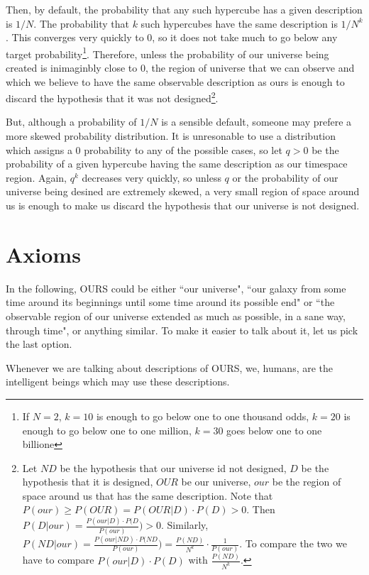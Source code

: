 \documentclass[a4paper
,draft
]{article}
\newcommand{\ghilimele}[1]{``#1"}
\begin{document}
Then, by default, the probability that any such hypercube has a given description is $1/N$. The probability that $k$ such hypercubes have the same description is $1/N^k$. This converges very quickly to $0$, so it does not take much to go below any target probability\footnote{If $N=2$, $k=10$ is enough to go below one to one thousand odds, $k=20$ is enough to go below one to one million, $k=30$ goes below one to one billione}. Therefore, unless the probability of our universe being created is inimaginbly close to $0$, the region of universe that we can observe and which we believe to have the same observable description as ours is enough to discard the hypothesis that it was not designed\footnote{Let $ND$ be the hypothesis that our universe id not designed, $D$ be the hypothesis that it is designed, $OUR$ be our universe, $our$ be the region of space around us that has the same description. Note that $P(our) \ge P(OUR)=P(OUR|D)\cdot P(D) > 0$. Then $P(D|our) = \frac{P(our|D)\cdot P(D}{P(our)}) > 0$. Similarly, $P(ND|our) = \frac{P(our|ND)\cdot P(ND}{P(our)}) = \frac{P(ND)}{N^k} \cdot \frac{1}{P(our)}$. To compare the two we have to compare $P(our|D)\cdot P(D)$ with $\frac{P(ND)}{N^k}$.}. 

But, although a probability of $1/N$ is a sensible default, someone may prefere
a more skewed probability distribution. It is unresonable to use a distribution
which assigns a $0$ probability to any of the possible cases, so let $q > 0$ be
the probability of a given hypercube having the same description as our
timespace region. Again, $q^k$ decreases very quickly, so unless $q$ or the
probability of our universe being desined are extremely skewed, a very small
region of space around us is enough to make us discard the
hypothesis that our universe is not designed.

\section{Axioms}

In the following, OURS could be either \ghilimele{our universe}, \ghilimele{our galaxy from some time around its beginnings until some time around its possible end} or \ghilimele{the observable region of our universe extended as much as possible, in a sane way, through time}, or anything similar. To make it easier to talk about it, let us pick the last option.

Whenever we are talking about descriptions of OURS, we, humans, are the intelligent beings which may use these descriptions.
\end{document}
